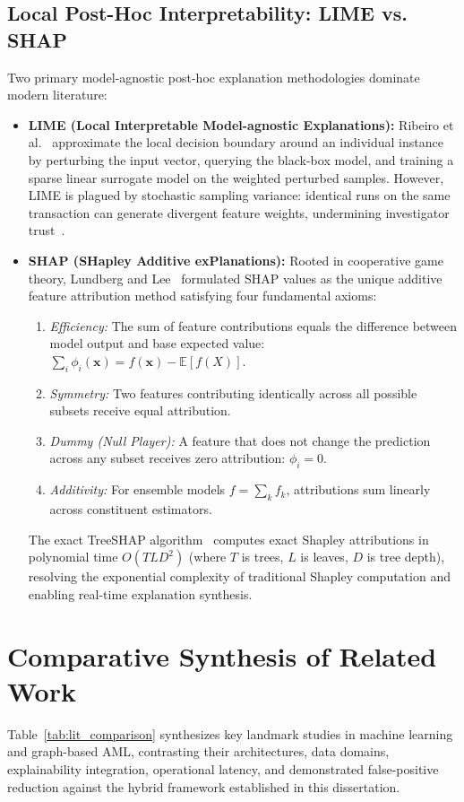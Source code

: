 \subsection{Local Post-Hoc Interpretability: LIME vs. SHAP}
Two primary model-agnostic post-hoc explanation methodologies dominate modern literature:
\begin{itemize}
    \item \textbf{LIME (Local Interpretable Model-agnostic Explanations):} Ribeiro et al.~\cite{ribeiro2016why} approximate the local decision boundary around an individual instance by perturbing the input vector, querying the black-box model, and training a sparse linear surrogate model on the weighted perturbed samples. However, LIME is plagued by stochastic sampling variance: identical runs on the same transaction can generate divergent feature weights, undermining investigator trust~\cite{nguyen2021evaluation}.
    \item \textbf{SHAP (SHapley Additive exPlanations):} Rooted in cooperative game theory, Lundberg and Lee~\cite{lundberg2017unified, lundberg2020local} formulated SHAP values as the unique additive feature attribution method satisfying four fundamental axioms:
    \begin{enumerate}
        \item \textit{Efficiency:} The sum of feature contributions equals the difference between model output and base expected value: $\sum_{i} \phi_i(\mathbf{x}) = f(\mathbf{x}) - \mathbb{E}[f(X)]$.
        \item \textit{Symmetry:} Two features contributing identically across all possible subsets receive equal attribution.
        \item \textit{Dummy (Null Player):} A feature that does not change the prediction across any subset receives zero attribution: $\phi_i = 0$.
        \item \textit{Additivity:} For ensemble models $f = \sum_k f_k$, attributions sum linearly across constituent estimators.
    \end{enumerate}
    The exact TreeSHAP algorithm~\cite{lundberg2020local} computes exact Shapley attributions in polynomial time $O(T L D^2)$ (where $T$ is trees, $L$ is leaves, $D$ is tree depth), resolving the exponential complexity of traditional Shapley computation and enabling real-time explanation synthesis.
\end{itemize}

\section{Comparative Synthesis of Related Work}
Table~\ref{tab:lit_comparison} synthesizes key landmark studies in machine learning and graph-based AML, contrasting their architectures, data domains, explainability integration, operational latency, and demonstrated false-positive reduction against the hybrid framework established in this dissertation.

